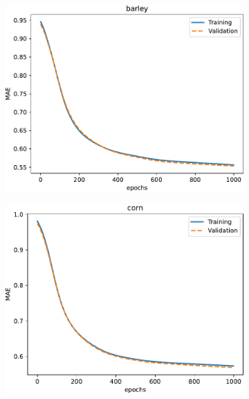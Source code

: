 \documentclass[journal,article,submit,pdftex,moreauthors]{Definitions/mdpi}
\begin{document}
\begin{figure}[H]
	\begin{subfigure}[t]{0.3\textwidth}
		\includegraphics[width=\linewidth]{figures/results_040923/loss_barley.pdf}
	\caption{}
	\label{fig:loss_barley}
	\end{subfigure}\hfill
	\begin{subfigure}[t]{0.3\textwidth}
	  \includegraphics[width=\linewidth]{figures/results_040923/loss_corn.pdf}
	\caption{}
	\label{fig:loss_corn}
	\end{subfigure}\hfill
	\begin{subfigure}[t]{0.3\textwidth}

\end{subfigure}
\end{figure}
\end{document}
